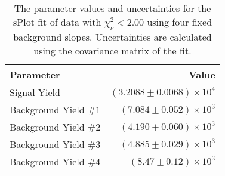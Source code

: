 
\begin{table}[ht]
    \begin{center}
        \begin{tabular}{lr}\toprule
            Parameter & Value \\\midrule
            Signal Yield & $(3.2088 \pm 0.0068) \times 10^{4}$ \\
            Background Yield $\#1$ & $(7.084 \pm 0.052) \times 10^{3}$ \\
            Background Yield $\#2$ & $(4.190 \pm 0.060) \times 10^{3}$ \\
            Background Yield $\#3$ & $(4.885 \pm 0.029) \times 10^{3}$ \\
            Background Yield $\#4$ & $(8.47 \pm 0.12) \times 10^{3}$ \\\bottomrule
        \end{tabular}
        \caption{The parameter values and uncertainties for the sPlot fit of data with $\chi^2_\nu < 2.00$ using four fixed background slopes. Uncertainties are calculated using the covariance matrix of the fit.}\label{tab:splot-fit-results-chisqdof-2.00-fixed-4}
    \end{center}
\end{table}
